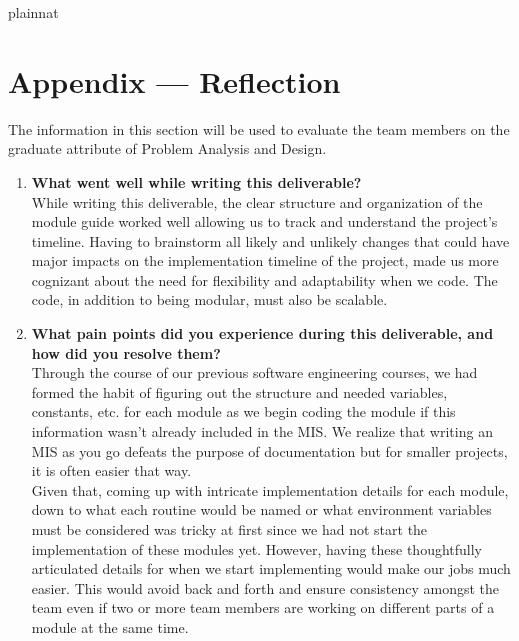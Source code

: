 \documentclass[12pt, titlepage]{article}
\begin{document}
 {plainnat}


\newpage{}

\section*{Appendix --- Reflection}
The information in this section will be used to evaluate the team members on the
graduate attribute of Problem Analysis and Design.

\begin{enumerate}
  \item \textbf{What went well while writing this deliverable?}\\
  \newline
  While writing this deliverable, the clear structure and organization of the module guide 
  worked well allowing us to track and understand the project's timeline. Having to brainstorm 
  all likely and unlikely changes that could have major impacts on the implementation timeline 
  of the project, made us more cognizant about the need for flexibility and adaptability when 
  we code. The code, in addition to being modular, must also be scalable.
  \item \textbf{What pain points did you experience during this deliverable, and how
    did you resolve them?}\\
  \newline
  Through the course of our previous software engineering courses, we had formed the habit of 
  figuring out the structure and needed variables, constants, etc. for each module as we begin 
  coding the module if this information wasn't already included in the MIS. We realize that writing 
  an MIS as you go defeats the purpose of documentation but for smaller projects, it is often easier 
  that way.\\
  \newline
  Given that, coming up with intricate implementation details for each module, down to what each 
  routine would be named or what environment variables must be considered was tricky at first since 
  we had not start the implementation of these modules yet. However, having these thoughtfully 
  articulated details for when we start implementing would make our jobs much easier. This would avoid 
  back and forth and ensure consistency amongst the team even if two or more team members are working on 
  different parts of a module at the same time.


\end{enumerate}
\end{document}
